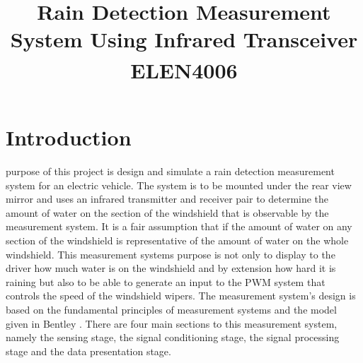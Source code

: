 \documentclass[conference, 11pt]{IEEEtran}
\begin{document}
\title{Rain Detection Measurement System Using Infrared Transceiver\\
{\footnotesize \textsuperscript{}ELEN4006}
}

\author{
\and
{}
}

\maketitle

\begin{abstract}

\end{abstract}

\begin{IEEEkeywords}

\end{IEEEkeywords}

\section{Introduction}
 purpose of this project is design and simulate a rain detection measurement system for an electric vehicle. The system is to be mounted under the rear view mirror and uses an infrared transmitter and receiver pair to determine the amount of water on the section of the windshield that is observable by the measurement system. It is a fair assumption that if the amount of water on any section of the windshield is representative of the amount of water on the whole windshield.  This measurement systems purpose is not only to display to the driver how much water is on the windshield and by extension how hard it is raining but also to be able to generate an input to the PWM system that controls the speed of the windshield wipers. The measurement system's design is based on the fundamental principles of measurement systems and the model given in Bentley \cite{BENT}. There are four main sections to this measurement system, namely the sensing stage, the signal conditioning stage, the signal processing stage and the data presentation stage. \\
\end{document}
